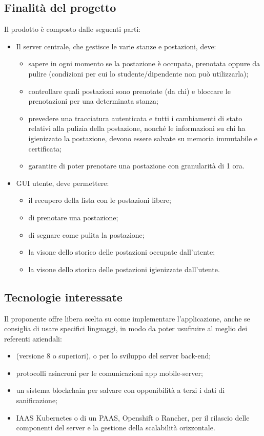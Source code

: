 \subsection{Finalità del progetto}
Il prodotto è composto dalle seguenti parti:
\begin{itemize}
\item Il server centrale, che gestisce le varie stanze e postazioni, deve:
\begin{itemize}
\item sapere in ogni momento se la postazione è occupata, prenotata oppure da pulire (condizioni per cui
lo studente/dipendente non può utilizzarla);
\item controllare quali postazioni sono prenotate (da chi) e bloccare le prenotazioni per una determinata stanza;
\item prevedere una tracciatura autenticata e tutti i cambiamenti di stato relativi alla pulizia della
postazione, nonché le informazioni su chi ha igienizzato la postazione, devono essere salvate su
memoria immutabile e certificata;
\item garantire di poter prenotare una postazione con granularità di 1 ora.
\end{itemize}
\item GUI utente, deve permettere:
\begin{itemize}
\item il recupero della lista con le postazioni libere;
\item di prenotare una postazione;
\item di segnare come pulita la postazione;
\item la visone dello storico delle postazioni occupate dall'utente;
\item la visone dello storico delle postazioni igienizzate dall'utente.
\end{itemize}
\end{itemize}

\subsection{Tecnologie interessate}
Il proponente offre libera scelta su come implementare l'applicazione, anche se consiglia di usare specifici linguaggi, in modo da poter usufruire al meglio dei referenti aziendali:
\begin{itemize}
\item {} (versione 8 o superiori),  o  per lo sviluppo del server back-end;
\item protocolli asincroni per le comunicazioni app mobile-server;
\item un sistema blockchain per salvare con opponibilità a terzi i dati di sanificazione;
\item IAAS Kubernetes o di un PAAS, Openshift o Rancher, per il rilascio delle componenti del server e la
gestione della scalabilità orizzontale.
\end{itemize}

